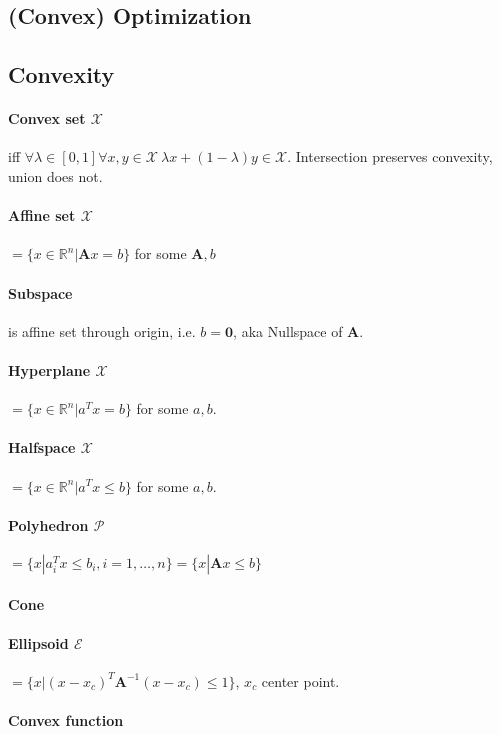 \documentclass[landscape,a4paper,8pt]{scrartcl}
\newcommand{\mc}[1]{\mathcal{#1}}
\newcommand{\R}{\mathbb R}
\newcommand\vA{\bm{A}}
\begin{document}
\begin{multicols*}{3}
\section{(Convex) Optimization}
\subsection{Convexity}
\paragraph{Convex set $\mc X$} iff $\forall \lambda \in [0, 1] \forall x, y \in \mc X\ \lambda x + (1-\lambda) y \in \mc X$.
Intersection preserves convexity, union does not.
\paragraph{Affine set $\mc X$} $= \{ x \in \R^n | \vA x = b \}$ for some $\vA,b$
\paragraph{Subspace} is affine set through origin, i.e. $b = \bm 0$, aka Nullspace of $\vA$.
\paragraph{Hyperplane $\mc X$} $= \{ x \in \R^n | a^T x = b \}$ for some $a, b$.
\paragraph{Halfspace $\mc X$} $= \{ x \in \R^n | a^T x \leq b \}$ for some $a, b$.
\paragraph{Polyhedron $\mc P$} $= \{ x | a_i^Tx \leq b_i, i = 1, \dots, n \} = \{ x | \vA x \leq b \}$
\paragraph{Cone}
\paragraph{Ellipsoid $\mc E$} $= \{ x | (x-x_c)^T\vA^{-1}(x-x_c) \leq 1 \}$, $x_c$ center point.

\paragraph{Convex function}


\end{multicols*}
\end{document}
